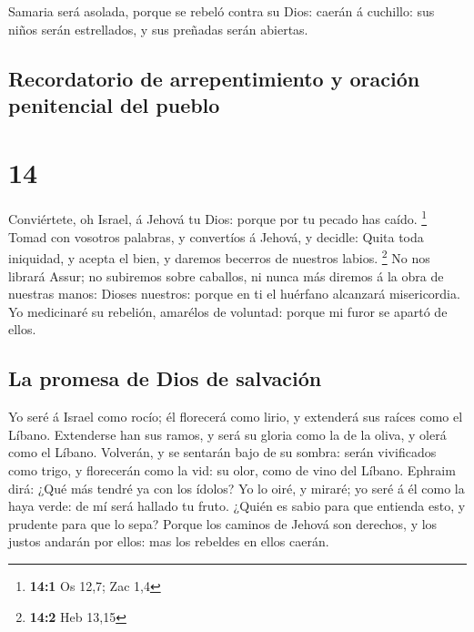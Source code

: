  Samaria será asolada, porque se rebeló contra su Dios:
caerán á cuchillo: sus niños serán estrellados, y sus preñadas serán
abiertas.

\hypertarget{recordatorio-de-arrepentimiento-y-oraciuxf3n-penitencial-del-pueblo}{%
\subsection{Recordatorio de arrepentimiento y oración penitencial del
pueblo}\label{recordatorio-de-arrepentimiento-y-oraciuxf3n-penitencial-del-pueblo}}

\hypertarget{section-13}{%
\section{14}\label{section-13}}

 Conviértete, oh Israel, á Jehová tu Dios: porque por tu
pecado has caído. \footnote{\textbf{14:1} Os 12,7; Zac 1,4} 
Tomad con vosotros palabras, y convertíos á Jehová, y decidle: Quita
toda iniquidad, y acepta el bien, y daremos becerros de nuestros labios.
\footnote{\textbf{14:2} Heb 13,15}  No nos librará Assur; no
subiremos sobre caballos, ni nunca más diremos á la obra de nuestras
manos: Dioses nuestros: porque en ti el huérfano alcanzará misericordia.
 Yo medicinaré su rebelión, amarélos de voluntad: porque mi
furor se apartó de ellos.

\hypertarget{la-promesa-de-dios-de-salvaciuxf3n}{%
\subsection{La promesa de Dios de
salvación}\label{la-promesa-de-dios-de-salvaciuxf3n}}

 Yo seré á Israel como rocío; él florecerá como lirio, y
extenderá sus raíces como el Líbano.  Extenderse han sus
ramos, y será su gloria como la de la oliva, y olerá como el Líbano.
 Volverán, y se sentarán bajo de su sombra: serán
vivificados como trigo, y florecerán como la vid: su olor, como de vino
del Líbano.  Ephraim dirá: ¿Qué más tendré ya con los
ídolos? Yo lo oiré, y miraré; yo seré á él como la haya verde: de mí
será hallado tu fruto.  ¿Quién es sabio para que entienda
esto, y prudente para que lo sepa? Porque los caminos de Jehová son
derechos, y los justos andarán por ellos: mas los rebeldes en ellos
caerán.
